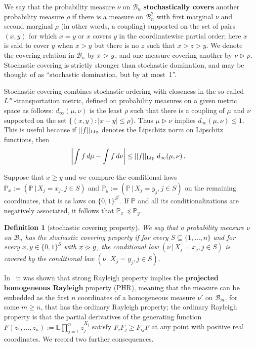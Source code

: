 \documentclass[10pt]{article}
\theoremstyle{plain}
\newtheorem{defn}[thm]{Definition}
\theoremstyle{remark}
\newcommand{\Em}[1]{\textbf{#1}}
\def\E{{\mathbb E}}
\def\P{{\mathbb P}}
\def\|{{\, | \, }}
\def\B{{\mathcal B}}
\def\covers{\; \cdot \kern-5pt >}
\def\mcovers{\triangleright}
\def\msr{\nu}
\def\msrr{\rho}
\begin{document}
We say that the probability measure $\msr$ on $\B_n$ \Em{stochastically
covers} another probability measure $\msrr$ if there is a measure on
$\B_n^2$ with first
marginal $\msr$ and second marginal $\msrr$ (in other words, a coupling)
supported on the set of pairs $(x,y)$ for which $x = y$ or $x$ covers
$y$ in the coordinatewise partial order; here $x$ is said to cover $y$
when $x > y$ but there is no $z$ such that $x > z > y$.  We denote
the covering relation in $\B_n$ by $x \covers y$, and one measure
covering another by $\msr \mcovers \msrr$.  Stochastic covering is strictly
stronger than stochastic domination, and may be thought of as
``stochastic domination, but by at most~1''.

Stochastic covering
combines stochastic ordering with closeness in the so-called
$L^\infty$-transportation metric, defined on probability
measures on a given metric space as follows: $d_\infty
(\mu , \nu)$ is the least $\rho$ such that there is a coupling
of $\mu$ and $\nu$ supported on the set $\{ (x,y) : |x-y| \leq \rho \}$.
Thus $\mu \mcovers \nu$ implies $d_\infty (\mu , \nu) \leq 1$.  This
is useful because if $||f||_{\rm Lip}$ denotes the Lipschitz norm on
Lipschitz functions, then
\begin{equation} \label{eq:transport}
\left | \int f \, d\mu - \int f \, d\nu \right |
  \leq ||f||_{\rm Lip} \; d_\infty (\mu , \nu) \, .
\end{equation}

Suppose that $x \geq y$ and we compare the conditional laws $\P_x :=
(\P \| X_j = x_j, j \in S)$ and $\P_y := (\P \| X_j = y_j, j \in S)$
on the remaining coordinates, that is as laws on  $\{ 0 , 1 \}^{S^c}$.
If $\P$ and all its conditionalizations are negatively associated, it
follows that $\P_x \preceq \P_y$.

\begin{defn}[stochastic covering property]
We say that a probability measure $\msr$ on $\B_n$ has the
stochastic covering property if for every $S \subseteq \{ 1 ,
\ldots , n \}$ and for every $x,y \in \{ 0 , 1 \}^S$ with $x \covers y$,
the conditional law $(\msr \| X_j = x_j, j \in S)$ is covered by
the conditional law $(\msr \| X_j = y_j, j \in S)$.
\end{defn}

In~\cite[Theorem~4.2]{borcea-branden-liggett} it was shown that
strong Rayleigh property implies the \Em{projected homogeneous Rayleigh}
property (PHR), meaning that the measure can be embedded as the
first $n$ coordinates of a homogeneous measure $\msr'$ on
$\B_m$, for some $m \geq n$, that
has the ordinary Rayleigh property; the ordinary Rayleigh property
is that the partial derivatives of the generating function
$F(z_1 , \ldots , z_n) := \E \prod_{j=1}^n z_j^{X_j}$ satisfy
$F_i F_j \geq F_{ij} F$ at any point with positive real coordinates.
We record two further consequences.
\end{document}
